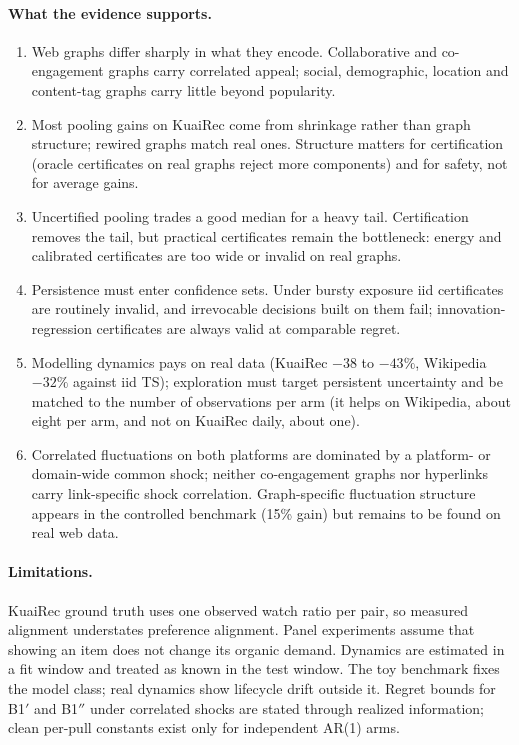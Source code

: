 \documentclass[11pt]{article}
\theoremstyle{definition}
\theoremstyle{remark}
\begin{document}
\paragraph{What the evidence supports.}
\begin{enumerate}
\item Web graphs differ sharply in what they encode. Collaborative and co-engagement graphs carry correlated appeal; social, demographic, location and content-tag graphs carry little beyond popularity.
\item Most pooling gains on KuaiRec come from shrinkage rather than graph structure; rewired graphs match real ones. Structure matters for certification (oracle certificates on real graphs reject more components) and for safety, not for average gains.
\item Uncertified pooling trades a good median for a heavy tail. Certification removes the tail, but practical certificates remain the bottleneck: energy and calibrated certificates are too wide or invalid on real graphs.
\item Persistence must enter confidence sets. Under bursty exposure iid certificates are routinely invalid, and irrevocable decisions built on them fail; innovation-regression certificates are always valid at comparable regret.
\item Modelling dynamics pays on real data (KuaiRec $-38$ to $-43\%$, Wikipedia $-32\%$ against iid TS); exploration must target persistent uncertainty and be matched to the number of observations per arm (it helps on Wikipedia, about eight per arm, and not on KuaiRec daily, about one).
\item Correlated fluctuations on both platforms are dominated by a platform- or domain-wide common shock; neither co-engagement graphs nor hyperlinks carry link-specific shock correlation. Graph-specific fluctuation structure appears in the controlled benchmark (15\% gain) but remains to be found on real web data.
\end{enumerate}

\paragraph{Limitations.} KuaiRec ground truth uses one observed watch ratio per pair, so measured alignment understates preference alignment. Panel experiments assume that showing an item does not change its organic demand. Dynamics are estimated in a fit window and treated as known in the test window. The toy benchmark fixes the model class; real dynamics show lifecycle drift outside it. Regret bounds for B1$'$ and B1$''$ under correlated shocks are stated through realized information; clean per-pull constants exist only for independent AR(1) arms.
\end{document}
